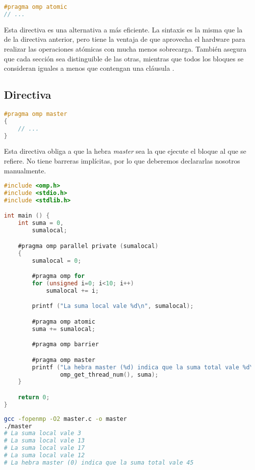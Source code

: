 \begin{lstlisting}[language=C]
#pragma omp atomic
// ...
\end{lstlisting}

Esta directiva es una alternativa a  más eficiente.
La sintaxis es la misma que la de la directiva anterior, pero tiene la ventaja de que aprovecha el hardware para realizar las operaciones atómicas con mucha menos sobrecarga.
También asegura que cada sección  sea distinguible de las otras, mientras que todos los bloques  se consideran iguales a menos que contengan una cláusula .

\subsection{Directiva }\label{directivas-openmp-directivas}

\begin{lstlisting}[language=C]
#pragma omp master
{
	// ...
}
\end{lstlisting}

Esta directiva obliga a que la hebra \textit{master} sea la que ejecute el bloque al que se refiere.
No tiene barreras implícitas, por lo que deberemos declararlas nosotros manualmente.

\begin{lstlisting}[language=C]
#include <omp.h>
#include <stdio.h>
#include <stdlib.h>

int main () {
	int suma = 0,
	    sumalocal;

	#pragma omp parallel private (sumalocal)
	{
		sumalocal = 0;

		#pragma omp for
		for (unsigned i=0; i<10; i++)
			sumalocal += i;

		printf ("La suma local vale %d\n", sumalocal);

		#pragma omp atomic
		suma += sumalocal;

		#pragma omp barrier

		#pragma omp master
		printf ("La hebra master (%d) indica que la suma total vale %d\n",
		        omp_get_thread_num(), suma);
	}

	return 0;
}
\end{lstlisting}

\begin{lstlisting}[language=sh]
gcc -fopenmp -O2 master.c -o master
./master
# La suma local vale 3
# La suma local vale 13
# La suma local vale 17
# La suma local vale 12
# La hebra master (0) indica que la suma total vale 45
\end{lstlisting}
